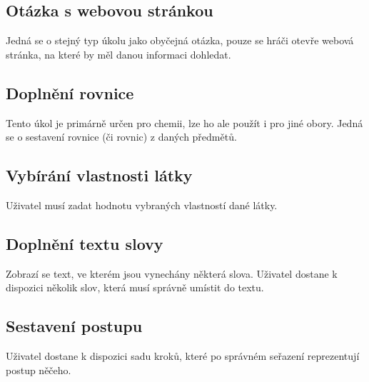 \documentclass[a4paper,12pt]{article}
\begin{document}
\subsection{Otázka s webovou stránkou}
Jedná se o stejný typ úkolu jako obyčejná otázka, pouze se hráči otevře webová stránka, na které by měl danou informaci dohledat.
\subsection{Doplnění rovnice}
Tento úkol je primárně určen pro chemii, lze ho ale použít i pro jiné obory. Jedná se o sestavení rovnice (či rovnic) z daných předmětů.
\begin{figure}[H]
\end{figure}
\subsection{Vybírání vlastnosti látky}
Uživatel musí zadat hodnotu vybraných vlastností dané látky.
\subsection{Doplnění textu slovy}
Zobrazí se text, ve kterém jsou vynechány některá slova. Uživatel dostane k dispozici několik slov, která musí správně umístit do textu.
\subsection{Sestavení postupu}
Uživatel dostane k dispozici sadu kroků, které po správném seřazení reprezentují postup něčeho.
\begin{figure}[H]
\end{figure}
\end{document}
